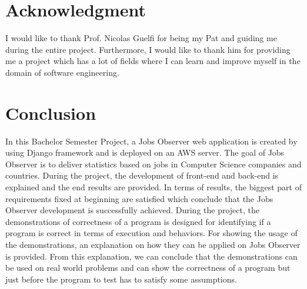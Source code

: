 \documentclass[conference,compsoc]{IEEEtran}
\begin{document}
\section*{Acknowledgment}
I would like to thank Prof. Nicolas Guelfi for being my Pat and guiding me during the entire project. Furthermore, I would like to thank him for providing me a project which has a lot of fields where I can learn and improve myself in the domain of software engineering. 


\section{Conclusion}
In this Bachelor Semester Project, a Jobs Observer web application is created by using Django framework and is deployed on an AWS server. The goal of Jobs Observer is to deliver statistics based on jobs in Computer Science companies and countries. During the project, the development of front-end and back-end is explained and the end results are provided. In terms of results, the biggest part of requirements fixed at beginning are satisfied which conclude that the Jobs Observer development is successfully achieved. 
\newline
\newline
During the project, the demonstrations of correctness of a program is designed for identifying if a program is correct in terms of execution and behaviors. For showing the usage of the demonstrations, an explanation on how they can be applied on Jobs Observer is provided. From this explanation, we can conclude that the demonstrations can be used on real world problems and can show the correctness of a program but just before the program to test has to satisfy some assumptions. 


%
%
\end{document}
